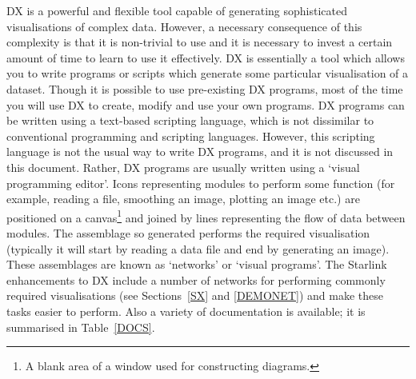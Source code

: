DX is a powerful and flexible tool capable of generating sophisticated
visualisations of complex data. However, a necessary consequence of
this complexity is that it is non-trivial to use and it is necessary to
invest a certain amount of time to learn to use it effectively. 
DX is essentially a tool which allows you to write programs or scripts
which generate some particular visualisation of a dataset. Though it is
possible to use pre-existing DX programs, most of the time you will use
DX to create, modify and use your own programs. DX programs can be
written using a text-based scripting language, which is not dissimilar
to conventional programming and scripting languages. However, this
scripting language is not the usual way to write DX programs, and it is
not discussed in this document. Rather, DX programs are usually written
using a `visual programming editor'. Icons representing modules to
perform some function (for example, reading a file, smoothing an image,
plotting an image etc.) are positioned on a canvas\footnote{A blank area
of a window used for constructing diagrams.} and joined by lines
representing the flow of data between modules. The assemblage so generated
performs the required visualisation (typically it will start by reading a
data file and end by generating an image). These assemblages are known as
`networks' or `visual programs'.  The Starlink enhancements to DX include
a number of networks for performing commonly required visualisations (see
Sections~\ref{SX} and \ref{DEMONET}) and make these tasks easier to perform.
Also a variety of documentation is available; it is summarised in
Table~\ref{DOCS}.


